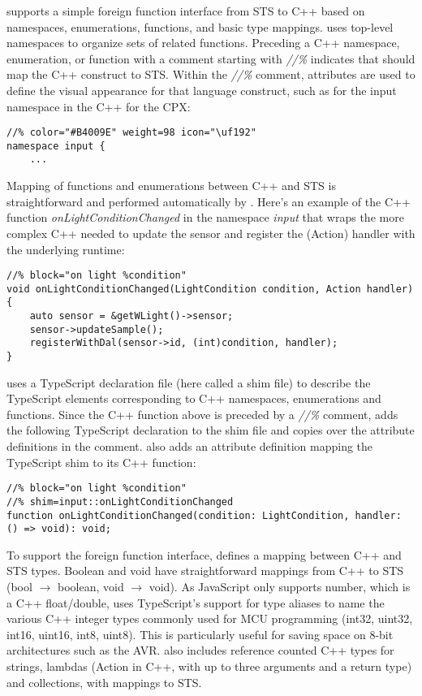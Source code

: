 \MC supports a simple foreign function interface from STS to C++ based on namespaces,
enumerations, functions, and basic type mappings. \MC uses top-level namespaces to organize sets of related functions.  Preceding a C++ namespace, enumeration, or function
with a comment starting with \emph{//\%} indicates that \MC should map the C++ construct to STS.
Within the \emph{//\%} comment, attributes are used to define the visual appearance for that
language construct, such as for the input namespace in the C++ for the CPX:
\begin{lstlisting}
//% color="#B4009E" weight=98 icon="\uf192"
namespace input {
    ...
\end{lstlisting}

Mapping of functions and enumerations between C++ and STS is straightforward
and performed automatically by \MC.
Here's an example of the C++ function \emph{onLightConditionChanged}
in the namespace \emph{input} that
wraps the more complex C++ needed to update the sensor and register the (Action)
handler with the underlying \CO runtime:
\begin{lstlisting}
//% block="on light %condition"
void onLightConditionChanged(LightCondition condition, Action handler) {
    auto sensor = &getWLight()->sensor;
    sensor->updateSample();
    registerWithDal(sensor->id, (int)condition, handler);
}
\end{lstlisting}

\MC uses a TypeScript declaration file (here called a shim file) to describe the TypeScript
elements corresponding to C++ namespaces, enumerations and functions.
Since the C++ function above is preceded by a \emph{//\%} comment,
\MC adds the following TypeScript declaration to the shim file and copies
over the attribute definitions in the comment. \MC also adds an attribute definition mapping
the TypeScript shim to its C++ function:

\begin{lstlisting}
//% block="on light %condition"
//% shim=input::onLightConditionChanged
function onLightConditionChanged(condition: LightCondition, handler: () => void): void;
\end{lstlisting}

To support the foreign function interface, \MC defines a mapping between C++ and STS types.
Boolean and void have straightforward mappings from C++ to STS (bool $\rightarrow$ boolean, void $\rightarrow$ void).
As JavaScript only supports number, which is a C++ float/double, \MC uses TypeScript's support
for type aliases to name the various C++ integer types commonly used for MCU programming
(int32, uint32, int16, uint16, int8, uint8).
This is particularly useful for saving space on 8-bit architectures such as the AVR.
\MC also includes reference counted C++ types for strings, lambdas (Action in C++, with
up to three arguments and a return type) and collections, with mappings to STS.

